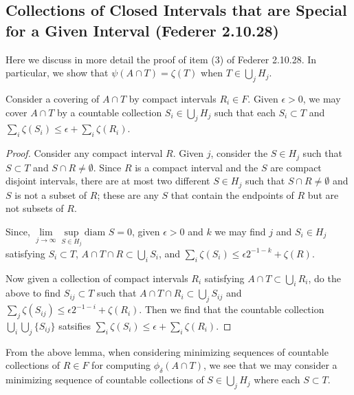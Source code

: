 \subsection{Collections of Closed Intervals that are Special for a Given Interval (Federer 2.10.28)}

Here we discuss in more detail the proof of item (3) of Federer 2.10.28. In particular, we show that 
\(\psi(A \cap T) = \zeta(T)\) when \(T \in \bigcup_j H_j\).

\begin{lemma}
Consider a covering of \(A \cap T\) by compact intervals \(R_i \in F\). Given \(\epsilon > 0\), we may
cover \(A \cap T\) by a countable collection \(S_i \in \bigcup_j H_j\) such that each \(S_i \subset T\) and
\(\sum_i \zeta(S_i) \leq \epsilon + \sum_i \zeta(R_i)\).
\end{lemma}
\begin{proof}
Consider any compact interval \(R\). Given \(j\), consider the
\(S \in H_j\) such that \(S \subset T\) and \(S \cap R \neq \emptyset\). Since \(R\) is a compact interval
and the \(S\) are compact disjoint intervals, there are at most
two different \(S \in H_j\) such that \(S \cap R \neq \emptyset\) and \(S\) is not a subset of \(R\); these
are any \(S\) that contain the endpoints of \(R\) but are not subsets of \(R\). 

Since, \(\lim\limits_{j\to \infty}\sup\limits_{S\in H_j} \text{diam } S = 0\), given \(\epsilon > 0\) and
\(k\) we may find \(j\) and \(S_i \in H_j\) satisfying \(S_i \subset T\),
\(A \cap T \cap R \subset \bigcup_i S_i\), and 
\(\sum_i \zeta(S_i) \leq \epsilon 2^{-1-k} + \zeta(R)\).

Now given a collection of compact intervals \(R_i\) satisfying \(A \cap T \subset \bigcup_i R_i\), do the above
to find \(S_{ij} \subset T\) such that \(A \cap T \cap R_i \subset \bigcup_j S_{ij}\) and
\(\sum_j \zeta(S_{ij}) \leq \epsilon 2^{-1 - i} + \zeta(R_i)\). Then we find that the countable collection
\(\bigcup_i \bigcup_j \{S_{ij}\}\) satsifies
\(\sum_i \zeta(S_i) \leq \epsilon + \sum_i \zeta(R_i)\). 
\end{proof}

From the above lemma, when considering minimizing sequences of countable collections of \(R\in F\) for
computing \(\phi_\delta(A \cap T)\),
we see that we may consider a minimizing sequence of countable collections of \(S \in \bigcup_j H_j\) where
each \(S \subset T\).

